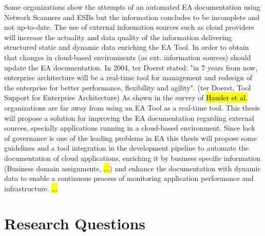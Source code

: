 Some organizations show the attempts of an automated EA documentation using Network Scanners and ESBs but the information concludes to be incomplete and not up-to-date. 
The use of external information sources such as cloud providers will increase the actuality and data quality of the information delivering structured static and dynamic data enriching the EA Tool. In order to obtain that changes in cloud-based environments (as ext. information sources) should update the EA documentation.
In 2004, ter Doerst stated: "in 7 years from now, enterprise architecture will be a real-time tool for management and redesign of the enterprise for better performance, flexibility and agility". (ter Doerst, Tool Support for Enterprise Architecture)
As shown in the survey of \hl{Hauder et al.} organizations are far away from using an EA Tool as a real-time tool. This thesis will propose a solution for improving the EA documentation regarding external sources, specially applications running in a cloud-based environment. Since lack of governance is one of the leading problems in EA this thesis will propose some guidelines %
and a tool integration in the development pipeline to automate the documentation of cloud applications, enriching it by business specific information (Business domain assignments, \hl{...}) and enhance the documentation with dynamic data to enable a continuous process of monitoring application performance and infrastructure.
\hl{ ... }

\section{Research Questions}\label{section:researchquestions}


